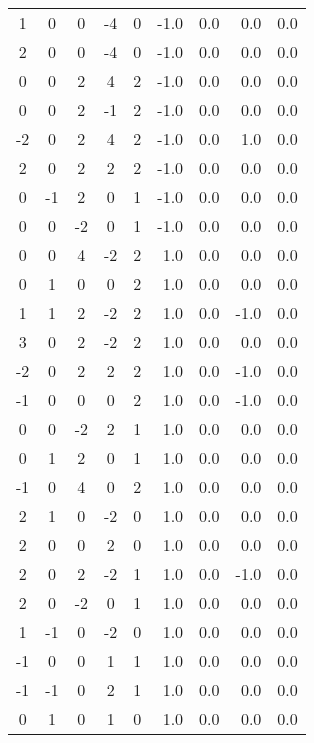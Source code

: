\begin{center}
{\begin{xtabular}{|ccccc|rr|rr|}
  1 &  0 &  0 & -4 &  0 &      -1.0  &      0.0  &      0.0   &     0.0     \\
  2 &  0 &  0 & -4 &  0 &      -1.0  &      0.0  &      0.0   &     0.0     \\
  0 &  0 &  2 &  4 &  2 &      -1.0  &      0.0  &      0.0   &     0.0     \\
  0 &  0 &  2 & -1 &  2 &      -1.0  &      0.0  &      0.0   &     0.0     \\
 -2 &  0 &  2 &  4 &  2 &      -1.0  &      0.0  &      1.0   &     0.0     \\
  2 &  0 &  2 &  2 &  2 &      -1.0  &      0.0  &      0.0   &     0.0     \\
  0 & -1 &  2 &  0 &  1 &      -1.0  &      0.0  &      0.0   &     0.0     \\
  0 &  0 & -2 &  0 &  1 &      -1.0  &      0.0  &      0.0   &     0.0     \\
  0 &  0 &  4 & -2 &  2 &       1.0  &      0.0  &      0.0   &     0.0     \\
  0 &  1 &  0 &  0 &  2 &       1.0  &      0.0  &      0.0   &     0.0     \\
  1 &  1 &  2 & -2 &  2 &       1.0  &      0.0  &     -1.0   &     0.0     \\
  3 &  0 &  2 & -2 &  2 &       1.0  &      0.0  &      0.0   &     0.0     \\
 -2 &  0 &  2 &  2 &  2 &       1.0  &      0.0  &     -1.0   &     0.0     \\
 -1 &  0 &  0 &  0 &  2 &       1.0  &      0.0  &     -1.0   &     0.0     \\
  0 &  0 & -2 &  2 &  1 &       1.0  &      0.0  &      0.0   &     0.0     \\
  0 &  1 &  2 &  0 &  1 &       1.0  &      0.0  &      0.0   &     0.0     \\
 -1 &  0 &  4 &  0 &  2 &       1.0  &      0.0  &      0.0   &     0.0     \\
  2 &  1 &  0 & -2 &  0 &       1.0  &      0.0  &      0.0   &     0.0     \\
  2 &  0 &  0 &  2 &  0 &       1.0  &      0.0  &      0.0   &     0.0     \\
  2 &  0 &  2 & -2 &  1 &       1.0  &      0.0  &     -1.0   &     0.0     \\
  2 &  0 & -2 &  0 &  1 &       1.0  &      0.0  &      0.0   &     0.0     \\
  1 & -1 &  0 & -2 &  0 &       1.0  &      0.0  &      0.0   &     0.0     \\
 -1 &  0 &  0 &  1 &  1 &       1.0  &      0.0  &      0.0   &     0.0     \\
 -1 & -1 &  0 &  2 &  1 &       1.0  &      0.0  &      0.0   &     0.0     \\
  0 &  1 &  0 &  1 &  0 &       1.0  &      0.0  &      0.0   &     0.0     \\ 
\end{xtabular}}
\end{center}

\normalsize
